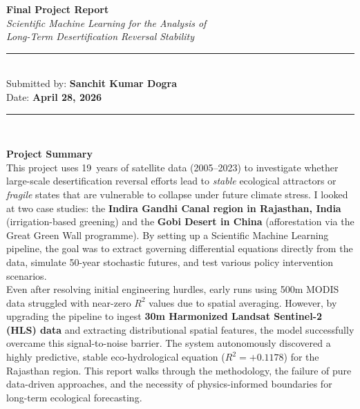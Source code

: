 \documentclass[12pt, a4paper]{article}
\begin{document}
\begin{titlepage}
    \centering
    \vspace*{2cm}
    {\LARGE \textbf{Final Project Report}}\\[0.6cm]
    {\large \textit{Scientific Machine Learning for the Analysis of}}\\[0.2cm]
    {\large \textit{Long-Term Desertification Reversal Stability}}\\[1.8cm]
    \rule{\textwidth}{1pt}\\[0.6cm]
    {\large Submitted by: \textbf{Sanchit Kumar Dogra}}\\[0.3cm]
    {\large Date: \textbf{April 28, 2026}}\\[0.6cm]
    \rule{\textwidth}{1pt}\\[1.5cm]
    \begin{mdframed}[style=keybox]
        \textbf{Project Summary}\\[6pt]
        This project uses 19~years of satellite data (2005--2023) to investigate
        whether large-scale desertification reversal efforts lead to
        \emph{stable} ecological attractors or \emph{fragile} states that are vulnerable
        to collapse under future climate stress. I looked at two case studies:
        the \textbf{Indira Gandhi Canal region in Rajasthan, India} (irrigation-based
        greening) and the \textbf{Gobi Desert in China} (afforestation via the
        Great Green Wall programme). By setting up a Scientific Machine Learning pipeline,
        the goal was to extract governing differential equations directly from the data, simulate
        50-year stochastic futures, and test various policy intervention scenarios.\\[6pt]
        Even after resolving initial engineering hurdles, early runs using 500m MODIS data struggled with near-zero $R^2$ values due to spatial averaging. However, by upgrading the pipeline to ingest \textbf{30m Harmonized Landsat Sentinel-2 (HLS) data} and extracting distributional spatial features, the model successfully overcame this signal-to-noise barrier. The system autonomously discovered a highly predictive, stable eco-hydrological equation ($R^2 = +0.1178$) for the Rajasthan region. This report walks through the methodology, the failure of pure data-driven approaches, and the necessity of physics-informed boundaries for long-term ecological forecasting.
    \end{mdframed}
    \vfill
\end{titlepage}
\end{document}
